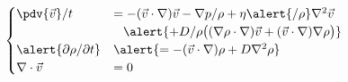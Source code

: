 \begin{equation}\label{eq:vdinse_sys}
\begin{cases}
  \pdv{\vec{v}}/{t} &=
      - (\vec{v} \cdot \nabla)\vec{v}
      - \nabla{p} / \rho
      + \eta\alert{/\rho} \nabla^2\vec{v}
      \\
      &\phantom{=} \alert{
      + D/\rho \big(
            (\nabla{\rho} \cdot \nabla)\vec{v}
          + (\vec{v} \cdot \nabla)\nabla\rho
        \big)}
  \\
  \alert{\partial\rho / \partial{t}} &\alert{=
    - (\vec{v} \cdot \nabla)\rho
    + D \nabla^2 \rho}
  \\
  \nabla \cdot \vec{v} &= 0
\end{cases}
\end{equation}
